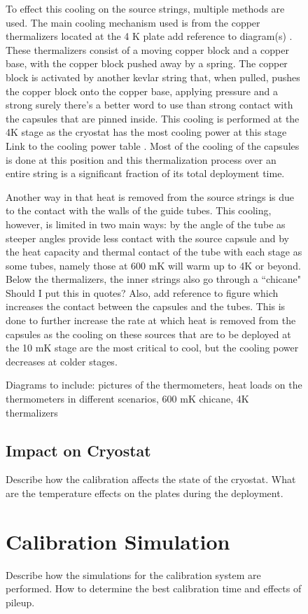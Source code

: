 \begin{figure}[htpb]
To effect this cooling on the source strings, multiple methods are used. The main cooling mechanism used is from the copper thermalizers located at the 4 K plate \color{red} add reference to diagram(s) \color{black}. These thermalizers consist of a moving copper block and a copper base, with the copper block pushed away by a spring. The copper block is activated by another kevlar string that, when pulled, pushes the copper block onto the copper base, applying pressure and a strong \color{red} surely there's a better word to use than strong \color{black} contact with the capsules that are pinned inside. This cooling is performed at the 4K stage as the cryostat has the most cooling power at this stage \color{red} Link to the cooling power table \color{black}. Most of the cooling of the capsules is done at this position and this thermalization process over an entire string is a significant fraction of its total deployment time.

Another way in that heat is removed from the source strings is due to the contact with the walls of the guide tubes. This cooling, however, is limited in two main ways: by the angle of the tube as steeper angles provide less contact with the source capsule and by the heat capacity and thermal contact of the tube with each stage as some tubes, namely those at 600 mK will warm up to 4K or beyond. Below the thermalizers, the inner strings also go through a ``chicane" \color{red} Should I put this in quotes? Also, add reference to figure\color{black} which increases the contact between the capsules and the tubes. This is done to further increase the rate at which heat is removed from the capsules as the cooling on these sources that are to be deployed at the 10 mK stage are the most critical to cool, but the cooling power decreases at colder stages. 

Diagrams to include: pictures of the thermometers, heat loads on the thermometers in different scenarios, 600 mK chicane, 4K thermalizers
\subsection{Impact on Cryostat}

Describe how the calibration affects the state of the cryostat. What are the temperature effects on the plates during the deployment.


\section{Calibration Simulation}
Describe how the simulations for the calibration system are performed. How to determine the best calibration time and effects of pileup.


\end{figure}
